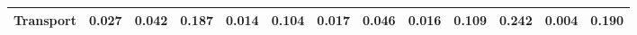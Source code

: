 \begin{table}[htbp]
\begin{tabular}{lcccccccccccc}
  Transport & \textcolor[RGB]{156,101,99}{0.027} & \textcolor[RGB]{131,85,124}{0.042} & \textcolor[RGB]{27,17,228}{0.187} & \textcolor[RGB]{195,126,60}{0.014} & \textcolor[RGB]{53,34,202}{0.104} & \textcolor[RGB]{189,123,66}{0.017} & \textcolor[RGB]{126,81,129}{0.046} & \textcolor[RGB]{191,124,64}{0.016} & \textcolor[RGB]{46,30,209}{0.109} & \textcolor[RGB]{21,14,234}{0.242} & \textcolor[RGB]{237,154,18}{0.004} & \textcolor[RGB]{25,16,230}{0.190} \\ 
   \hline
\end{tabular}
\end{table}
